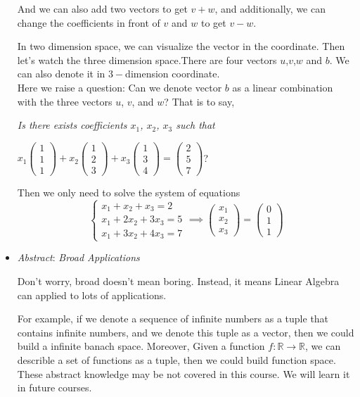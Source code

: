\begin{itemize}
\begin{example}
And we can also add two vectors to get $v+w$, and additionally, we can change the coefficients in front of $v$ and $w$ to get $v-w$.

In two dimension space, we can visualize the vector in the coordinate. Then let's watch the three dimension space.There are four vectors $u$,$v$,$w$ and $b$. We can also denote it in $3-$dimension coordinate.
\\
Here we raise a question: Can we denote vector $b$ as a linear combination with the three vectors $u$, $v$, and $w$? That is to say,

\qquad \textit{Is there exists coefficients $x_1$, $x_2$, $x_3$ such that }


\hfill$x_1 \begin{pmatrix}
1 \\ 1 \\ 1
\end{pmatrix}+
x_2 \begin{pmatrix}
1 \\ 2 \\ 3
\end{pmatrix}+
x_3 \begin{pmatrix}
1 \\ 3 \\ 4
\end{pmatrix}=
\begin{pmatrix}
2 \\ 5 \\ 7
\end{pmatrix}$?

Then we only need to solve the system of equations 
\[\left\{ \begin{gathered}
x_1 + x_2 + x_3 = 2 \\
x_1 + 2x_2 + 3x_3 = 5 \\
x_1 + 3x_2 + 4x_3 = 7
\end{gathered} \right.
\implies \begin{pmatrix}
x_1 \\ x_2 \\ x_3
\end{pmatrix} = \begin{pmatrix}
0 \\ 1 \\ 1
\end{pmatrix}
\]
\end{example}




\item \textit{Abstract}: \emph{Broad Applications}

Don't worry, broad doesn't mean boring. Instead, it means Linear Algebra can applied to lots of applications.

For example, if we denote a sequence of infinite numbers as a tuple that contains infinite numbers, and we denote this tuple as a vector, then we could build a infinite banach space. Moreover, Given a function $f:\mathbb{R} \to \mathbb{R}$, we can describle a set of functions as a tuple, then we could build function space. These abstract knowledge may be not covered in this course. We will learn it in future courses.

\end{itemize}

